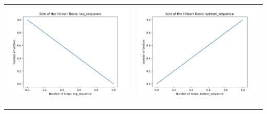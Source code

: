 \documentclass[10pt]{article}
\begin{document}
\begin{tabular}{c|c}
\begin{minipage}{.4\textwidth}
\includegraphics[width=\textwidth]{"DATA/5d/6 generators 1 bound C/top_sequence SIZE"}
\end{minipage} &
\begin{minipage}{.4\textwidth}
\includegraphics[width=\textwidth]{"DATA/5d/6 generators 1 bound C bottomup/bottom_sequence SIZE"}
\end{minipage} \\ \\
\hline \\\begin{minipage}{.4\textwidth}

\end{minipage}
\end{tabular}
\end{document}
